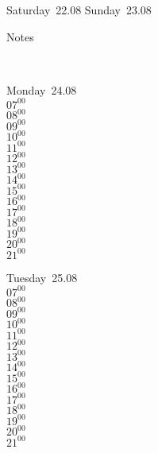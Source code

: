 \documentclass[11pt,a4paper]{book}\usepackage[]{graphicx}\usepackage[]{color}
\begin{document}
{{{{{{{{\begin{tcolorbox}
\end{tcolorbox} 
\begin{tcolorbox}[height=(\textheight-10mm)/6]
Saturday~22.08
\tcblower
Sunday~23.08
\end{tcolorbox} %
\begin{tcolorbox}[height=(\textheight-10mm)/6,sidebyside=false]
Notes
\end{tcolorbox}
\clearpage
\vspace{2 mm}\\
\begin{tcolorbox}
Monday~24.08\\
{ 
  $07^{00}$\\
$08^{00}$\\
$09^{00}$\\
$10^{00}$\\
$11^{00}$\\
$12^{00}$\\
$13^{00}$\\
$14^{00}$\\
$15^{00}$\\
$16^{00}$\\
$17^{00}$\\
$18^{00}$\\
$19^{00}$\\
$20^{00}$\\
$21^{00}$}\\

\end{tcolorbox}
\begin{tcolorbox}
Tuesday~25.08\\
{ 
  $07^{00}$\\
$08^{00}$\\
$09^{00}$\\
$10^{00}$\\
$11^{00}$\\
$12^{00}$\\
$13^{00}$\\
$14^{00}$\\
$15^{00}$\\
$16^{00}$\\
$17^{00}$\\
$18^{00}$\\
$19^{00}$\\
$20^{00}$\\
$21^{00}$}\\


\end{tcolorbox}}}}}}}}}
\end{document}
